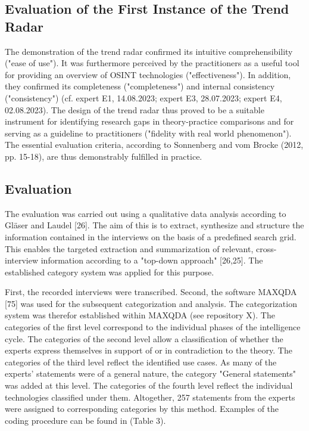 \documentclass[10pt]{article}
\begin{document}
\subsection{Evaluation of the First Instance of the Trend Radar}

The demonstration of the trend radar confirmed its intuitive
comprehensibility ("ease of use"). It was furthermore perceived by the
practitioners as a useful tool for providing an overview of OSINT
technologies ("effectiveness"). In addition, they confirmed its
completeness ("completeness") and internal consistency ("consistency")
(cf. expert E1, 14.08.2023; expert E3, 28.07.2023; expert E4,
02.08.2023). The design of the trend radar thus proved to be a
suitable instrument for identifying research gaps in theory-practice
comparisons and for serving as a guideline to practitioners
("fidelity with real world phenomenon"). The essential evaluation
criteria, according to Sonnenberg and vom Brocke (2012, pp. 15-18),
are thus demonstrably fulfilled in practice.

\subsection{Evaluation}

The evaluation was carried out using a qualitative data analysis
according to Gläser and Laudel [26]. The aim of this is to extract,
synthesize and structure the information contained in the interviews
on the basis of a predefined search grid. This enables the targeted
extraction and summarization of relevant, cross-interview information
according to a "top-down approach" [26,25]. The established category
system was applied for this purpose.

First, the recorded interviews were transcribed. Second, the software
MAXQDA [75] was used for the subsequent categorization and analysis.
The categorization system was therefor established within MAXQDA
(see repository X). The categories of the first level correspond to
the individual phases of the intelligence cycle. The categories of the
second level allow a classification of whether the experts express
themselves in support of or in contradiction to the theory. The
categories of the third level reflect the identified use cases.
As many of the experts' statements were of a general nature, the
category "General statements" was added at this level. The categories
of the fourth level reflect the individual technologies classified
under them. Altogether, 257 statements from the experts were assigned
to corresponding categories by this method. Examples of the coding
procedure can be found in (Table 3).
\end{document}
